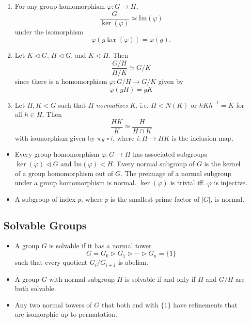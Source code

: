 \documentclass{article}
\begin{document}
\begin{enumerate}
  \item{
    For any group homomorphism $\varphi : G \to H$,
    $$
    \frac{G}{\ker(\varphi)} \simeq \mathrm{Im}(\varphi)
    $$
    under the isomorphism
    $$
    \bar{\varphi}(g \ker(\varphi)) = \varphi(g).
    $$
  }
  \item{
    Let $K \triangleleft G$, $H \triangleleft G$, and $K < H$. Then
    $$
    \frac{G / H}{H / K} \simeq G / K
    $$
    since there is a homomorphism $\varphi : G / H \to G / K$ given by
    $$
    \varphi(gH) = gK
    $$

  }
  \item{
    Let $H, K < G$ such that $H$ \emph{normalizes} $K$, i.e. $H <
    N(K)$ or $hKh^{-1} = K$ for all $h \in H$. Then
    $$
    \frac{HK}{K} \simeq \frac{H}{H \cap K}
    $$
    with isomorphism given by $\pi_K \circ i$, where $i : H \to HK$ is
    the inclusion map.
  }
\end{enumerate}

\begin{itemize}
  \item{
    Every group homomorphism $\varphi : G \to H$ has associated
    subgroups $\ker(\varphi) \triangleleft G$ and
    $\mathrm{Im}(\varphi) < H$. Every normal subgroup of $G$ is the
    kernel of a group homomorphism out of $G$. The preimage of a
    normal subgroup under a group homomorphism is normal.
    $\ker(\varphi)$ is trivial iff. $\varphi$ is injective.
  }
  \item{
    A subgroup of index $p$, where $p$ is the smallest prime factor of
    $|G|$, is normal.
  }
\end{itemize}

\subsection{Solvable Groups}
\begin{itemize}
  \item{
    A group $G$ is solvable if it has a normal tower
    $$
    G
  = G_0    \triangleright
    G_1    \triangleright
    \cdots \triangleright
    G_n
  = \{ 1 \}
    $$
    such that every quotient $G_i / G_{i+1}$ is abelian.
  }
  \item{
    A group $G$ with normal subgroup $H$ is solvable if and only if
    $H$ and $G / H$ are both solvable.
  }
  \item{
    Any two normal towers of $G$ that both end with $\{1\}$ have
    refinements that are isomorphic up to permutation.
  }
\end{itemize}
\end{document}
